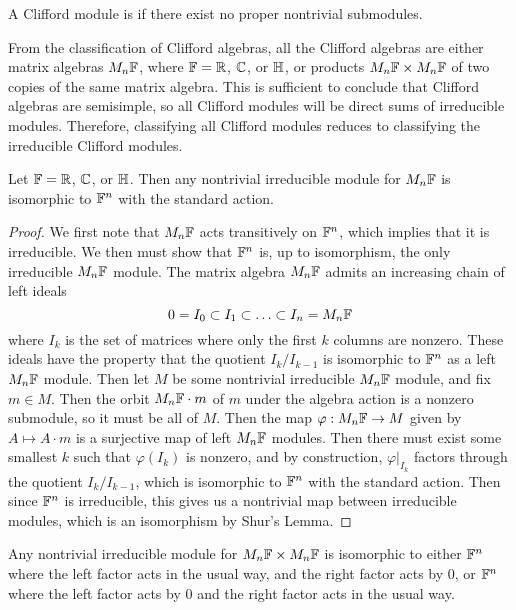 %
\begin{defn}
A Clifford module is  if there exist no proper nontrivial submodules.
\end{defn}
%
From the classification of Clifford algebras, all the Clifford algebras are either
matrix algebras $M_n\mathbb{F}$, where $\mathbb{F} = \mathbb{R}$, $\mathbb{C}$, or $\mathbb{H}$, or products
$M_n\mathbb{F} \times M_n\mathbb{F}$ of two copies of the same matrix algebra. This is sufficient
to conclude that Clifford algebras are semisimple, so all Clifford modules
will be direct sums of irreducible modules. Therefore, classifying all Clifford
modules reduces to classifying the irreducible Clifford modules.
%
\begin{thm}
Let $\mathbb{F} = \mathbb{R}$, $\mathbb{C}$, or $\mathbb{H}$. Then any nontrivial irreducible module for
$M_n\mathbb{F}$ is isomorphic to $\mathbb{F}^n$ with the standard action.
\end{thm}
%
\begin{proof}
We first note that $M_n\mathbb{F}$ acts transitively on $\mathbb{F}^n$, which implies that
it is irreducible. We then must show that $\mathbb{F}^n$ is, up to isomorphism, the only
irreducible $M_n\mathbb{F}$ module. The matrix algebra $M_n\mathbb{F}$ admits an increasing
chain of left ideals
\[
0 = I_0 \subset I_1 \subset \ldots \subset I_n = M_n\mathbb{F}
\]
where $I_k$ is the set of matrices where only the first $k$ columns are nonzero.
These ideals have the property that the quotient $I_k / I_{k-1}$ is isomorphic
to $\mathbb{F}^n$ as a left $M_n\mathbb{F}$ module. Then let $M$ be some nontrivial irreducible
$M_n\mathbb{F}$ module, and fix $m \in M$. Then the orbit $M_n\mathbb{F} \cdot m$ of $m$
under the algebra action is a nonzero submodule, so it must be all of $M$.
Then the map $\varphi : M_n\mathbb{F} \to M$ given by $A \mapsto A \cdot m$ is
a surjective map of left $M_n\mathbb{F}$ modules. Then there must exist some smallest
$k$ such that $\varphi(I_k)$ is nonzero, and by construction,
$\varphi\vert_{I_k}$ factors through the quotient $I_k / I_{k-1}$, which
is isomorphic to $\mathbb{F}^n$ with the standard action. Then since $\mathbb{F}^n$ is irreducible,
this gives us a nontrivial map between irreducible modules, which is an isomorphism
by Shur's Lemma.
\end{proof}
%
\begin{thm}
Any nontrivial irreducible module for $M_n\mathbb{F} \times M_n\mathbb{F}$ is isomorphic to
either $\mathbb{F}^n$ where the left factor acts in the usual way, and the right factor
acts by $0$, or $\mathbb{F}^n$ where the left factor acts by $0$ and the right factor
acts in the usual way.
\end{thm}
%
